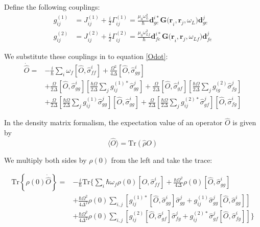 \documentclass[a4paper, 11pt]{article}
\numberwithin{equation}{section}
\begin{document}
Define the following couplings:
\begin{align}
  g^{(1)}_{ij} &= J^{(1)}_{ij} + \frac{i}{2}\Gamma^{(1)}_{ij} =
  \frac{\mu_0\omega_L^2}{\hbar}\mathbf{d}_{ge}^{i*} \mathbf{G(r}_i, \mathbf{r}_j,
  \omega_L)\mathbf{d}_{ge}^j\\
  g^{(2)}_{ij} &= J^{(2)}_{ij} + \frac{i}{2}\Gamma^{(2)}_{ij} =
  \frac{\mu_0\omega_{Lf}^2}{\hbar}\mathbf{d}^{i*}_{fe} \mathbf{G(r}_i, \mathbf{r}_j,
  \omega_{Lf})\mathbf{d}^j_{fe}
\end{align}

We substitute these couplings in to equation \ref{Odot}:
\begin{equation}
  \begin{aligned}
  \dot{\hat{O}} = &-\frac{i}{\hbar}\sum_i \omega_f [\hat{O}, \hat{\sigma}_{ff}^i] +
  \frac{\Omega^2}{4\Delta}[\hat{O}, \hat{\sigma}_{gg}^i]\\&+ \frac{\Omega}{2\Delta}
  [\hat{O}, \hat{\sigma}_{gg}^i]\left[ \frac{\hbar\Omega}{2\Delta}\sum_j
  g^{(1)*}_{ij}\hat{\sigma}_{gg}^j 
  \right]+ \frac{\Omega}{2\Delta}
  [\hat{O}, \hat{\sigma}_{gf}^i]\left[ \frac{\hbar\Omega}{2\Delta}\sum_j  g_{ig}^{(2)}\hat{\sigma}_{fg}^j \right] \\&+ \frac{\Omega}{2\Delta}
  \left[ \frac{\hbar\Omega}{2\Delta}\sum_j g_{ij}^{(1)}\hat{\sigma}_{gg}^j \right][\hat{O}, \hat{\sigma}_{gg}^i]+ \frac{\Omega}{2\Delta}
  \left[ \frac{\hbar\Omega}{2\Delta}\sum_j  g_{ij}^{(2)*}\hat{\sigma}_{gf}^j \right][\hat{O}, \hat{\sigma}_{fg}^i]
  \end{aligned}
\end{equation}

In the density matrix formalism, the expectation value of an operator $\hat{O}$ is
given by \[\langle \hat{O} \rangle = \text{Tr}(\hat{\rho} O)\]


We multiply both sides by $\rho(0)$ from the left and take the trace:

\begin{equation}
  \begin{aligned}
    \text{Tr}\left\{\rho(0)\dot{\hat{O}}\right\} =
    &-\frac{i}{\hbar}\text{Tr}\Bigg\{\sum_i \hbar\omega_f \rho(0)[\hat{O},
      \hat{\sigma}_{ff}^i] +
  \frac{\hbar\Omega^2}{4\Delta}\rho(0)[\hat{O}, \hat{\sigma}_{gg}^i]\\&+
  \frac{\hbar\Omega^2}{4\Delta^2} \rho(0) \sum_{i,j} \left[ g_{ij}^{(1)*}[\hat{O},
\hat{\sigma}_{gg}^i]\hat{\sigma}_{gg}^j + g_{ij}^{(1)}\hat{\sigma}_{gg}^j
[\hat{O}, \hat{\sigma}_{gg}^i]\right]\\&+
  \frac{\hbar\Omega^2}{4\Delta^2} \rho(0) \sum_{i,j} \left[ g_{ij}^{(2)}[\hat{O},
\hat{\sigma}_{gf}^i]\hat{\sigma}_{fg}^j + g_{ij}^{(2)*}\hat{\sigma}_{gf}^j
[\hat{O}, \hat{\sigma}_{fg}^i]\right] \Bigg\}\end{aligned}
\end{equation}
\end{document}
